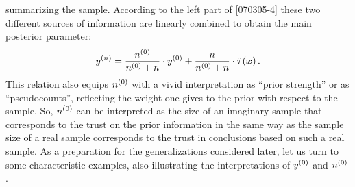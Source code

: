 summarizing the sample. According to the left
part of \eqref{070305-4} these two different sources of information
are linearly combined to obtain the main posterior parameter:
\begin{equation}\label{071214-2}
\yn = \frac{\nz}{\nz + n} \cdot \yz + \frac{n}{\nz + n} \cdot \ttau(\x)\,. %
\end{equation}
This relation also equips $n^{(0)}$ with a vivid interpretation as ``prior strength''
or as ``pseudocounts'',
reflecting the weight one gives to the prior with respect to the sample.
So, $n^{(0)}$ can be
interpreted as the size of an imaginary sample that corresponds to
the trust on the prior information in the same way as the sample
size of a real sample corresponds to the trust in conclusions based
on such a real sample. %
%
%
%
As a preparation for the generalizations considered later, let us
turn to some characteristic examples, also illustrating the
interpretations of $y^{(0)}$ and $n^{(0)}$.

